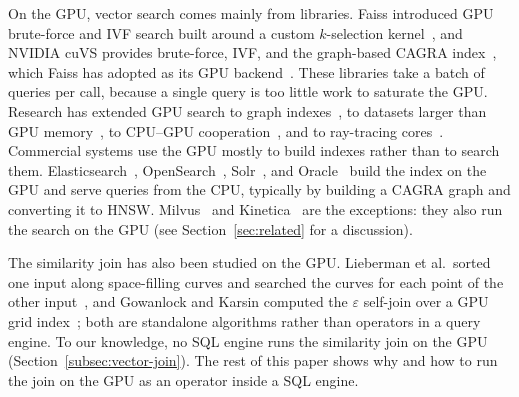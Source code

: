On the GPU, vector search comes mainly from libraries.
Faiss introduced GPU brute-force and IVF search built around a custom $k$-selection kernel~\cite{JohnsonFaissGPU21}, and NVIDIA cuVS provides brute-force, IVF, and the graph-based CAGRA index~\cite{NvidiaCuVS26, OotomoCAGRA24}, which Faiss has adopted as its GPU backend~\cite{MetaFaissCuVS25}.
These libraries take a batch of queries per call, because a single query is too little work to saturate the GPU\@.
Research has extended GPU search to graph indexes~\cite{ZhaoSONG19, GrohGGNN22}, to datasets larger than GPU memory~\cite{KarthikBANG24, ZhangRummy24}, to CPU--GPU cooperation~\cite{TianFusionANNS25}, and to ray-tracing cores~\cite{LiuJuno24}.
Commercial systems use the GPU mostly to build indexes rather than to search them.
Elasticsearch~\cite{ElasticGPUIndexing}, OpenSearch~\cite{OpenSearchGPU25}, Solr~\cite{SolrCuVS}, and Oracle~\cite{OracleVectorIndexService} build the index on the GPU and serve queries from the CPU, typically by building a CAGRA graph and converting it to HNSW\@.
Milvus~\cite{MilvusGPUIndex} and Kinetica~\cite{KineticaVectorSearch} are the exceptions: they also run the search on the GPU (see Section~\ref{sec:related} for a discussion).

The similarity join has also been studied on the GPU.
Lieberman et al.\ sorted one input along space-filling curves and searched the curves for each point of the other input~\cite{LiebermanGPUSimJoin08}, and Gowanlock and Karsin computed the $\varepsilon$ self-join over a GPU grid index~\cite{GowanlockGPUSelfJoin19}; both are standalone algorithms rather than operators in a query engine.
To our knowledge, no SQL engine runs the similarity join on the GPU (Section~\ref{subsec:vector-join}).
The rest of this paper shows why and how to run the join on the GPU as an operator inside a SQL engine.
